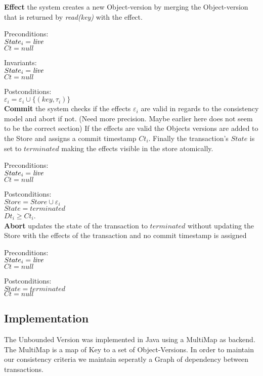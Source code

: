 \documentclass[systeme,french,english]{compas2022}
\begin{document}
\textbf{Effect} the system creates a new Object-version by merging the Object-version that is returned by \emph{read(key)} with the effect.

Preconditions:\\ 
$State_i = \emph{live}$ \\
$Ct = null$

Invariants:\\
$State_i = \emph{live}$ \\
$Ct = null$

Postconditions:\\
$\varepsilon_i = \varepsilon_i \cup \{(key, \tau_i)\}$ \\

\textbf{Commit} the system checks if the effects $\varepsilon_i$ are valid in regards to the consistency model and abort if not. (Need more precision. Maybe earlier here does not seem to be the correct section)
If the effects are valid the Objects versions are added to the Store and assigns a commit timestamp $Ct_i$.
Finally the transaction's $State$ is set to $terminated$ making the effects visible in the store atomically.

Preconditions:\\ 
$State_i = \emph{live}$ \\
$Ct = null$

Postconditions:\\
$Store = Store \cup \varepsilon_i$\\
$State = terminated$\\
$Dt_i \geq Ct_i$.\\

\textbf{Abort} updates the state of the transaction to $terminated$ without updating the Store with the effects of the transaction and no commit timestamp is assigned

Preconditions:\\ 
$State_i = \emph{live}$ \\
$Ct = null$ 

Postconditions:\\
$State = terminated$\\
$Ct = null$


\subsection{Implementation}

The Unbounded Version was implemented in Java using a MultiMap as backend.
The MultiMap is a map of Key to a set of Object-Versions.
In order to maintain our consistency criteria we maintain seperatly a Graph of dependency between transactions.
\end{document}
